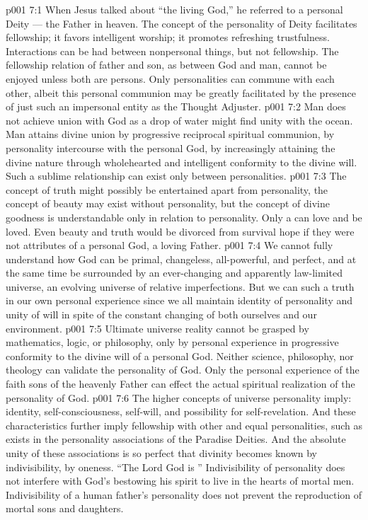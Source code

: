 \vs p001 7:1 When Jesus talked about \textcolor{ubdarkred}{“the living God,”} he referred to a personal Deity --- the Father in heaven. The concept of the personality of Deity facilitates fellowship; it favors intelligent worship; it promotes refreshing trustfulness. Interactions can be had between nonpersonal things, but not fellowship. The fellowship relation of father and son, as between God and man, cannot be enjoyed unless both are persons. Only personalities can commune with each other, albeit this personal communion may be greatly facilitated by the presence of just such an impersonal entity as the Thought Adjuster.
\vs p001 7:2 Man does not achieve union with God as a drop of water might find unity with the ocean. Man attains divine union by progressive reciprocal spiritual communion, by personality intercourse with the personal God, by increasingly attaining the divine nature through wholehearted and intelligent conformity to the divine will. Such a sublime relationship can exist only between personalities.
\vs p001 7:3 \pc The concept of truth might possibly be entertained apart from personality, the concept of beauty may exist without personality, but the concept of divine goodness is understandable only in relation to personality. Only a  can love and be loved. Even beauty and truth would be divorced from survival hope if they were not attributes of a personal God, a loving Father.
\vs p001 7:4 \pc We cannot fully understand how God can be primal, changeless, all\hyp{}powerful, and perfect, and at the same time be surrounded by an ever\hyp{}changing and apparently law\hyp{}limited universe, an evolving universe of relative imperfections. But we can  such a truth in our own personal experience since we all maintain identity of personality and unity of will in spite of the constant changing of both ourselves and our environment.
\vs p001 7:5 Ultimate universe reality cannot be grasped by mathematics, logic, or philosophy, only by personal experience in progressive conformity to the divine will of a personal God. Neither science, philosophy, nor theology can validate the personality of God. Only the personal experience of the faith sons of the heavenly Father can effect the actual spiritual realization of the personality of God.
\vs p001 7:6 \pc The higher concepts of universe personality imply: identity, self\hyp{}consciousness, self\hyp{}will, and possibility for self\hyp{}revelation. And these characteristics further imply fellowship with other and equal personalities, such as exists in the personality associations of the Paradise Deities. And the absolute unity of these associations is so perfect that divinity becomes known by indivisibility, by oneness. “The Lord God is ” Indivisibility of personality does not interfere with God’s bestowing his spirit to live in the hearts of mortal men. Indivisibility of a human father’s personality does not prevent the reproduction of mortal sons and daughters.
